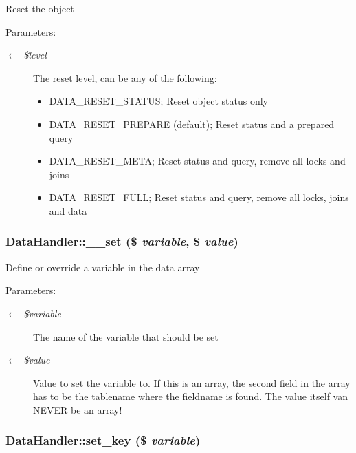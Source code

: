 Reset the object \begin{Desc}
\item[Parameters:]
\begin{description}
\item[\mbox{$\leftarrow$} {\em \$level}]The reset level, can be any of the following:\begin{itemize}
\item DATA\_\-RESET\_\-STATUS; Reset object status only\item DATA\_\-RESET\_\-PREPARE (default); Reset status and a prepared query\item DATA\_\-RESET\_\-META; Reset status and query, remove all locks and joins\item DATA\_\-RESET\_\-FULL; Reset status and query, remove all locks, joins and data \end{itemize}
\end{description}
\end{Desc}
\hypertarget{classDataHandler_16c81c9564a7feaf530ce5d51ed99df7}{
\subsubsection{\setlength{\rightskip}{0pt plus 5cm}DataHandler::\_\-\_\-set (\$ {\em variable}, \$ {\em value})}}
\label{classDataHandler_16c81c9564a7feaf530ce5d51ed99df7}


Define or override a variable in the data array

\begin{Desc}
\item[Parameters:]
\begin{description}
\item[\mbox{$\leftarrow$} {\em \$variable}]The name of the variable that should be set \item[\mbox{$\leftarrow$} {\em \$value}]Value to set the variable to. If this is an array, the second field in the array has to be the tablename where the fieldname is found. The value itself van NEVER be an array! \end{description}
\end{Desc}
\hypertarget{classDataHandler_32ce223478b78a4ea9838a3c6ac7440c}{
\subsubsection{\setlength{\rightskip}{0pt plus 5cm}DataHandler::set\_\-key (\$ {\em variable})}}
\label{classDataHandler_32ce223478b78a4ea9838a3c6ac7440c}


